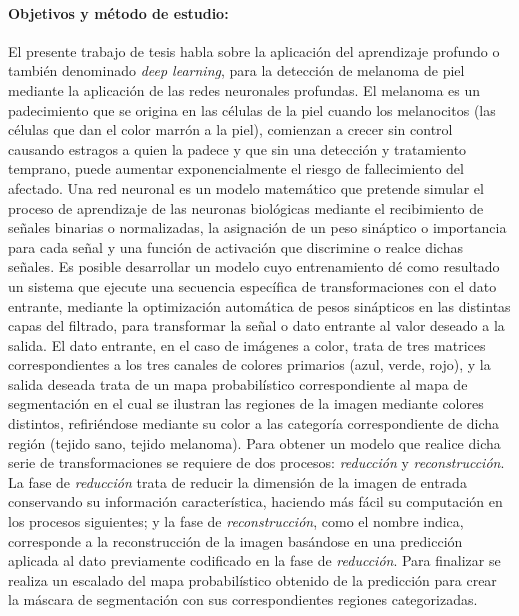 {\paragraph{Objetivos y método de estudio:}
El presente trabajo de tesis habla sobre la aplicación del aprendizaje profundo o también denominado \emph{deep learning}, para la detección de melanoma de piel mediante la aplicación de las redes neuronales profundas.
El melanoma es un padecimiento que se origina en las células de la piel cuando los melanocitos (las células que dan el color marrón a la piel), comienzan a crecer sin control causando estragos a quien la padece y que sin una detección y tratamiento temprano, puede aumentar exponencialmente el riesgo de fallecimiento del afectado.
Una red neuronal es un modelo matemático que pretende simular el proceso de aprendizaje de las neuronas biológicas mediante el recibimiento de señales binarias o normalizadas, la asignación de un peso sináptico o importancia para cada señal y una función de activación que discrimine o realce dichas señales. Es posible desarrollar un modelo cuyo entrenamiento dé como resultado un sistema que ejecute una secuencia específica de transformaciones con el dato entrante, mediante la optimización automática de pesos sinápticos en las distintas capas del filtrado, para transformar la señal o dato entrante al valor deseado a la salida. El dato entrante, en el caso de imágenes a color, trata de tres matrices correspondientes a los tres canales de colores primarios (azul, verde, rojo), y la salida deseada trata de un mapa probabilístico correspondiente al mapa de segmentación en el cual se ilustran las regiones de la imagen mediante colores distintos, refiriéndose mediante su color a las categoría correspondiente de dicha región (tejido sano, tejido melanoma). Para obtener un modelo que realice dicha serie de transformaciones se requiere de dos procesos: \emph{reducción} y \emph{reconstrucción}. La fase de \emph{reducción} trata de reducir la dimensión de la imagen de entrada conservando su información característica, haciendo más fácil su computación en los procesos siguientes; y la fase de \emph{reconstrucción}, como el nombre indica, corresponde a la reconstrucción de la imagen basándose en una predicción aplicada al dato previamente codificado en la fase de \emph{reducción}. Para finalizar se realiza un escalado del mapa probabilístico obtenido de la predicción para crear la máscara de segmentación con sus correspondientes regiones categorizadas.

}
